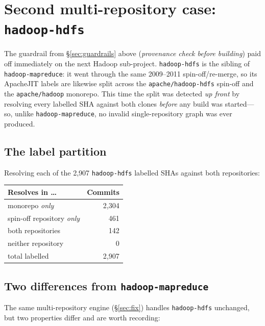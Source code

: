 \documentclass[11pt]{article}
\newcommand{\code}[1]{\texttt{#1}}
\begin{document}
\section{Second multi-repository case: \code{hadoop-hdfs}}
\label{sec:hdfs}
The guardrail from \S\ref{sec:guardrails} above (\emph{provenance check before
building}) paid off immediately on the next Hadoop sub-project. \code{hadoop-hdfs}
is the sibling of \code{hadoop-mapreduce}: it went through the same 2009--2011
spin-off/re-merge, so its ApacheJIT labels are likewise split across the
\code{apache/hadoop-hdfs} spin-off and the \code{apache/hadoop} monorepo. This
time the split was detected \emph{up front} by resolving every labelled SHA
against both clones \emph{before} any build was started---so, unlike
\code{hadoop-mapreduce}, no invalid single-repository graph was ever produced.

\subsection{The label partition}
Resolving each of the 2{,}907 \code{hadoop-hdfs} labelled SHAs against both
repositories:

\begin{center}
\begin{tabular}{@{}lr@{}}
\toprule
Resolves in \ldots{} & Commits \\
\midrule
monorepo \emph{only}            & 2{,}304 \\
spin-off repository \emph{only} & 461 \\
both repositories               & 142 \\
neither repository              & 0 \\
\midrule
total labelled                  & 2{,}907 \\
\bottomrule
\end{tabular}
\end{center}

\subsection{Two differences from \code{hadoop-mapreduce}}
The same multi-repository engine (\S\ref{sec:fix}) handles \code{hadoop-hdfs}
unchanged, but two properties differ and are worth recording:
\end{document}
